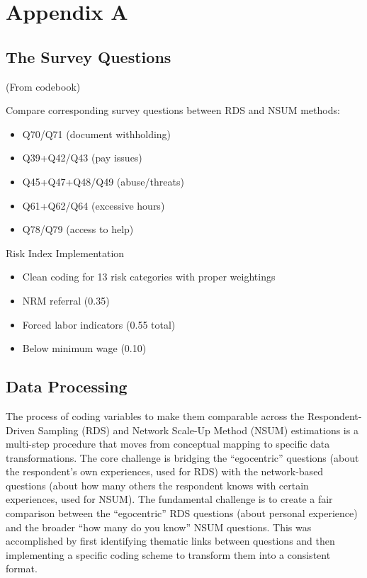 \documentclass[
  12pt,
  letterpaper,
  DIV=11,
  numbers=noendperiod]{scrartcl}
\providecommand{\tightlist}{%
  \setlength{\itemsep}{0pt}\setlength{\parskip}{0pt}}
\theoremstyle{plain}
\theoremstyle{definition}
\begin{document}
\printbibliography[heading=none]

\newpage

\appendix

\section{Appendix A}\label{app-survey}

\subsection{The Survey Questions}\label{the-survey-questions}

(From codebook)

Compare corresponding survey questions between RDS and NSUM methods:

\begin{itemize}
\tightlist
\item
  Q70/Q71 (document withholding)
\item
  Q39+Q42/Q43 (pay issues)
\item
  Q45+Q47+Q48/Q49 (abuse/threats)
\item
  Q61+Q62/Q64 (excessive hours)
\item
  Q78/Q79 (access to help)
\end{itemize}

Risk Index Implementation

\begin{itemize}
\tightlist
\item
  Clean coding for 13 risk categories with proper weightings
\item
  NRM referral (0.35)
\item
  Forced labor indicators (0.55 total)
\item
  Below minimum wage (0.10)
\end{itemize}

\subsection{Data Processing}\label{app-dataprep}

The process of coding variables to make them comparable across the
Respondent-Driven Sampling (RDS) and Network Scale-Up Method (NSUM)
estimations is a multi-step procedure that moves from conceptual mapping
to specific data transformations. The core challenge is bridging the
``egocentric'' questions (about the respondent's own experiences, used
for RDS) with the network-based questions (about how many others the
respondent knows with certain experiences, used for NSUM). The
fundamental challenge is to create a fair comparison between the
``egocentric'' RDS questions (about personal experience) and the broader
``how many do you know'' NSUM questions. This was accomplished by first
identifying thematic links between questions and then implementing a
specific coding scheme to transform them into a consistent format.
\end{document}
